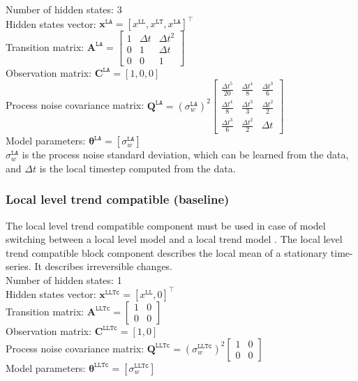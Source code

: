 \noindent
Number of hidden states: 3\\
Hidden states vector: $ \mathbf{x}^{\mathtt{LA}} = [x^{\mathtt{LL}}, x^{\mathtt{LT}} ,  x^{\mathtt{LA}}]^{\intercal}$\\
Transition matrix: $\mathbf{A}^{\mathtt{LA}}=  \left[\begin{array}{ccc}1 &\Delta t&\Delta t^{2}\\0&1&\Delta t\\0&0&1\end{array}\right]$\\
Observation matrix: $\mathbf{C}^{\mathtt{LA}}=[1, 0, 0]$\\
Process noise covariance matrix: $\mathbf{Q}^{\mathtt{LA}}=(\sigma_{w}^{\mathtt{LA}})^{2}\left[\begin{array}{ccc}\tfrac{\Delta t^{5}}{20} &\tfrac{\Delta t^{4}}{8} &\tfrac{\Delta t^{3}}{6}\\\tfrac{\Delta t^{4}}{8} &\tfrac{\Delta t^{3}}{3}&\tfrac{\Delta t^{2}}{2}\\\tfrac{\Delta t^{3}}{6}&\tfrac{\Delta t^{2}}{2}&\Delta t\end{array}\right]$\\
Model parameters: $\bm\theta^{\mathtt{LA}}=[\sigma_{w}^{\mathtt{LA}} ]$\\

\noindent
$\sigma_{w}^{\mathtt{LA}}$ is the process noise standard deviation, which can be learned from the data, and $\Delta t$ is the local timestep computed from the data.



\subsubsection{Local level trend compatible (baseline)}

The local level trend compatible component must be used in case of model switching between a local level model and a local trend model \cite{Nguyen2018}.
The local level trend compatible block component describes the local mean of a stationary time-series. 
It describes irreversible changes.\\

\noindent
Number of hidden states: 1\\
Hidden states vector: $ \mathbf{x}^{\mathtt{LLTc}} = [x^{\mathtt{LL}}, 0]^{\intercal}$\\
Transition matrix: $\mathbf{A}^{\mathtt{LLTc}}= \left[\begin{array}{cc}1 & 0\\0&0\end{array}\right]$\\
Observation matrix: $\mathbf{C}^{\mathtt{LLTc}}=[1, 0]$\\
Process noise covariance matrix: $\mathbf{Q}^{\mathtt{LLTc}}=(\sigma_{w}^{\mathtt{LLTc}})^{2}\left[\begin{array}{cc}1 &0\\0&0\end{array}\right]$\\
Model parameters: $\bm\theta^{\mathtt{LLTc}}=[\sigma_{w}^{\mathtt{LLTc}} ]$\\


